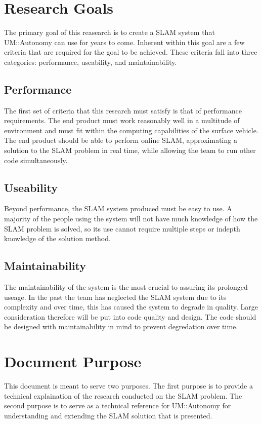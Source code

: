 \documentclass[10pt]{IEEEtran}
\begin{document}
\section{Research Goals}
The primary goal of this reasearch is to create a SLAM system that 
UM::Autonomy can use for years to come.  Inherent within this goal are a few criteria that
are required for the goal to be achieved. These criteria fall into three categories:
performance, useability, and maintainability.

\subsection{Performance}
The first set of criteria that this research must satisfy is that of performance
requirements.  The end product must work reasonably well in a multitude of environment and
must fit within the computing capabilities of the surface vehicle.  The end product
should be able to perform online SLAM, approximating a solution to the SLAM problem in 
real time, while allowing the team to run other code simultaneously.

\subsection{Useability}
Beyond performance, the SLAM system produced must be easy to use.  A majority of the 
people using the system will not have much knowledge of how the SLAM problem is solved,
so its use cannot require multiple steps or indepth knowledge of the solution method.

\subsection{Maintainability}
The maintainability of the system is the most crucial to assuring its prolonged useage.
In the past the team has neglected the SLAM system due to its complexity and over time,
this has caused the system to degrade in quality.  Large consideration therefore will
be put into code quality and design.  The code should be designed with maintainability in
mind to prevent degredation over time.

\section{Document Purpose}
This document is meant to serve two purposes.  The first purpose is to provide a 
technical explaination of the research conducted on the SLAM problem.  The second
purpose is to serve as a technical reference for UM::Autonomy for understanding and extending
the SLAM solution that is presented.
\end{document}
